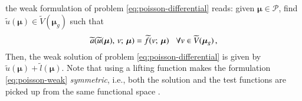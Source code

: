 \documentclass{elsarticle}
\theoremstyle{theorem}
\theoremstyle{definition}
\theoremstyle{remark}
\theoremstyle{proposition}
\numberwithin{figure}{section}
\newcommand{\wt}[1]{\widetilde{#1}}
\newcommand{\bg}[1]{\boldsymbol{#1}}
\begin{document}
		the weak formulation of problem \eqref{eq:poisson-differential} reads: given $\bg{\mu} \in \mathcal{P}$, find $\wt{u}(\bg{\mu}) \in \wt{V}(\bg{\mu}_g)$ such that
		\begin{equation}
			\label{eq:poisson-weak}
			\wt{a}(\wt{u}(\bg{\mu}), \, v; \, \bg{\mu}) = \wt{f}(v; \, \bg{\mu}) \hspace*{0.3cm} \forall v \in \wt{V}(\bg{\mu}_g) \, , 
		\end{equation}
		Then, the weak solution of problem \eqref{eq:poisson-differential} is given by $\wt{u}(\bg{\mu}) + \wt{l}(\bg{\mu})$. Note that using a lifting function makes the formulation \eqref{eq:poisson-weak} \emph{symmetric}, i.e., both the solution and the test functions are picked up from the same functional space \cite{Qua10}.
		
		
\end{document}
